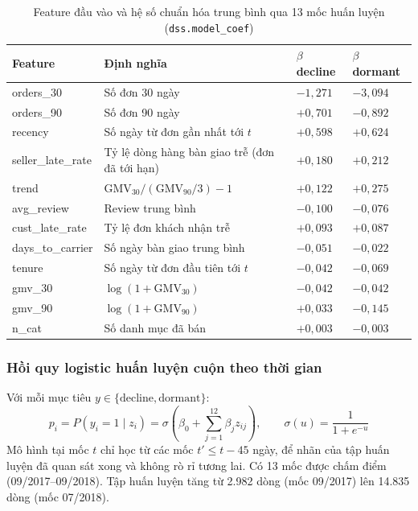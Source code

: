 \begin{table}[htbp]
\centering
\small
\caption{Feature đầu vào và hệ số chuẩn hóa trung bình qua 13 mốc huấn luyện (\texttt{dss.model\_coef})}
\label{tab:features}
\begin{tabularx}{\textwidth}{|>{\raggedright\arraybackslash\ttfamily}m{3.1cm}|L|>{\raggedleft\arraybackslash}m{1.7cm}|>{\raggedleft\arraybackslash}m{1.7cm}|}
\hline
\textbf{\rmfamily Feature} & \textbf{\rmfamily Định nghĩa} & \textbf{\rmfamily $\beta$ decline} & \textbf{\rmfamily $\beta$ dormant} \\
\hline
orders\_30 & Số đơn 30 ngày & $-1{,}271$ & $-3{,}094$ \\
\hline
orders\_90 & Số đơn 90 ngày & $+0{,}701$ & $-0{,}892$ \\
\hline
recency & Số ngày từ đơn gần nhất tới $t$ & $+0{,}598$ & $+0{,}624$ \\
\hline
seller\_late\_rate & Tỷ lệ dòng hàng bàn giao trễ (đơn đã tới hạn) & $+0{,}180$ & $+0{,}212$ \\
\hline
trend & $\text{GMV}_{30}/(\text{GMV}_{90}/3) - 1$ & $+0{,}122$ & $+0{,}275$ \\
\hline
avg\_review & Review trung bình & $-0{,}100$ & $-0{,}076$ \\
\hline
cust\_late\_rate & Tỷ lệ đơn khách nhận trễ & $+0{,}093$ & $+0{,}087$ \\
\hline
days\_to\_carrier & Số ngày bàn giao trung bình & $-0{,}051$ & $-0{,}022$ \\
\hline
tenure & Số ngày từ đơn đầu tiên tới $t$ & $-0{,}042$ & $-0{,}069$ \\
\hline
gmv\_30 & $\log(1+\text{GMV}_{30})$ & $-0{,}042$ & $-0{,}042$ \\
\hline
gmv\_90 & $\log(1+\text{GMV}_{90})$ & $+0{,}033$ & $-0{,}145$ \\
\hline
n\_cat & Số danh mục đã bán & $+0{,}003$ & $-0{,}003$ \\
\hline
\end{tabularx}
\end{table}

\subsubsection*{Hồi quy logistic huấn luyện cuộn theo thời gian}
Với mỗi mục tiêu $y \in \{\text{decline}, \text{dormant}\}$:
\begin{equation}
p_i = P(y_i = 1 \mid z_i) = \sigma\!\left(\beta_0 + \sum_{j=1}^{12} \beta_j z_{ij}\right), \qquad \sigma(u) = \frac{1}{1 + e^{-u}}
\end{equation}
Mô hình tại mốc $t$ chỉ học từ các mốc $t' \le t - 45$ ngày, để nhãn của tập huấn luyện đã quan sát xong và không rò rỉ tương lai. Có 13 mốc được chấm điểm (09/2017--09/2018). Tập huấn luyện tăng từ 2.982 dòng (mốc 09/2017) lên 14.835 dòng (mốc 07/2018).

